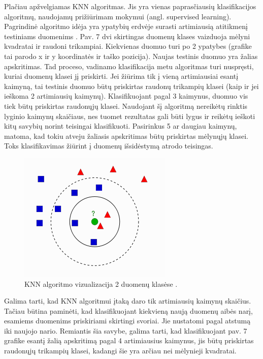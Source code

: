 \documentclass[a4paper,12pt]{article}
\begin{document}
\begin{itemize}
	Plačiau apžvelgiamas KNN algoritmas. Jis yra vienas paprasčiausių klasifikacijos algoritmų, naudojamų prižiūrimam mokymui (angl. supervised learning). Pagrindinė algoritmo idėja yra ypatybių erdvėje surasti artimiausią atitikmenį testiniams duomenims \cite{KNN}. Pav. 7 dvi skirtingas duomenų klases vaizduoja mėlyni kvadratai ir raudoni trikampiai. Kiekvienas duomuo turi po 2 ypatybes (grafike tai parodo x ir y koordinatės ir taško pozicija). Naujas testinis duomuo yra žalias apskritimas. Tad proceso, vadinamo klasifikacija metu algoritmas turi nuspręsti, kuriai duomenų klasei jį priskirti. Jei žiūrima tik į vieną artimiausiai esantį kaimyną, tai testinis duomuo būtų priskirtas raudonų trikampių klasei (kaip ir jei ieškoma 2 artimiausių kaimynų). Klasifikuojant pagal 3 kaimynus, duomuo vis tiek būtų priskirtas raudonųjų klasei. Naudojant šį algoritmą nereikėtų rinktis lyginio kaimynų skaičiaus, nes tuomet rezultatas gali būti lygus ir reikėtų ieškoti kitų savybių norint teisingai klasifikuoti. Pasirinkus 5 ar daugiau kaimynų, matoma, kad tokiu atveju žaliasis apskritimas būtų priskirtas mėlynųjų klasei. Toks klasifikavimas žiūrint į duomenų išsidėstymą atrodo teisingas.
		\begin{figure}[H]
			\centering
			\includegraphics[scale=0.6]{images/knn}
			\caption{KNN algoritmo vizualizacija 2 duomenų klasėse \cite{KNN}.}   %
			\label{img:knn}
		\end{figure}
	Galima tarti, kad KNN algoritmui įtaką daro tik artimiausių kaimynų skaičius. Tačiau būtina paminėti, kad klasifikuojant kiekvieną naują duomenų aibės narį, esamiems duomenims priskiriami skirtingi svoriai. Jie nustatomi pagal atstumą iki naujojo nario. Remiantis šia savybe, galima tarti, kad klasifikuojant pav. 7 grafike esantį žalią apskritimą pagal 4 artimiausius kaimynus, jis būtų priskirtas raudonųjų trikampių klasei, kadangi šie yra arčiau nei mėlynieji kvadratai.
\end{itemize} 
\end{document}
